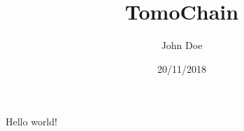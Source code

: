 \documentclass{article}
\title{TomoChain}
\date{20/11/2018}
\author{John Doe}
\begin{document}
	\maketitle
	\newpage
	
	Hello world!
\end{document}
